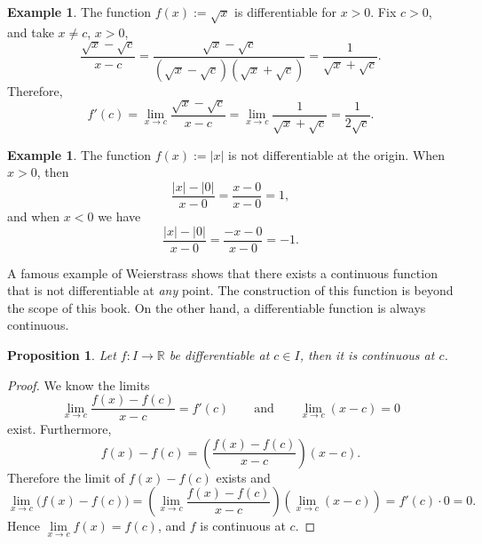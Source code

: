 \documentclass[12pt]{book}
\newcommand{\abs}[1]{\left\lvert {#1} \right\rvert}
\newcommand{\R}{{\mathbb{R}}}
\theoremstyle{plain}
\newtheorem{prop}[thm]{Proposition}
\theoremstyle{remark}
\theoremstyle{definition}
\theoremstyle{exercise}
\theoremstyle{example}
\newtheorem{example}[thm]{Example}
\begin{document}
\begin{example}
The function $f(x) := \sqrt{x}$ is differentiable for $x > 0$.  Fix $c > 0$,
and take $x \not= c$, $x > 0$,
\begin{equation*}
\frac{\sqrt{x}-\sqrt{c}}{x-c}
=
\frac{\sqrt{x}-\sqrt{c}}{(\sqrt{x}-\sqrt{c})(\sqrt{x}+\sqrt{c})}
=
\frac{1}{\sqrt{x}+\sqrt{c}} .
\end{equation*}
Therefore,
\begin{equation*}
f'(c) =
\lim_{x\to c}
\frac{\sqrt{x}-\sqrt{c}}{x-c}
=
\lim_{x\to c}
\frac{1}{\sqrt{x}+\sqrt{c}}
=
\frac{1}{2\sqrt{c}} .
\end{equation*}
\end{example}

\begin{example}
The function $f(x) := \abs{x}$ is not differentiable
at the origin.  When $x > 0$, then
\begin{equation*}
\frac{\abs{x}-\abs{0}}{x-0} =
\frac{x-0}{x-0} = 1 ,
\end{equation*}
and when $x < 0$ we have
\begin{equation*}
\frac{\abs{x}-\abs{0}}{x-0} =
\frac{-x-0}{x-0} = -1 .
\end{equation*}
\end{example}

A famous example of Weierstrass shows that there exists a continuous
function that is not differentiable at \emph{any} point.  The construction
of this function is beyond the scope of this book.  On the other hand,
a differentiable function
is always continuous.

\begin{prop}
Let $f \colon I \to \R$ be differentiable at $c \in I$,
then it is continuous at $c$.
\end{prop}

\begin{proof}
We know the limits
\begin{equation*}
\lim_{x\to c}\frac{f(x)-f(c)}{x-c} = f'(c)
\qquad
\text{and}
\qquad
\lim_{x\to c}(x-c) = 0
\end{equation*}
exist.  Furthermore,
\begin{equation*}
f(x)-f(c) = 
\left( \frac{f(x)-f(c)}{x-c} \right) (x-c) .
\end{equation*}
Therefore the limit of $f(x)-f(c)$ exists and
\begin{equation*}
\lim_{x\to c} \bigl( f(x)-f(c) \bigr) =
\left(\lim_{x\to c} \frac{f(x)-f(c)}{x-c} \right)
\left(\lim_{x\to c} (x-c) \right) =
f'(c) \cdot 0  = 0.
\end{equation*}
Hence $\lim\limits_{x\to c} f(x) = f(c)$, and $f$ is continuous at $c$.
\end{proof}
\end{document}
